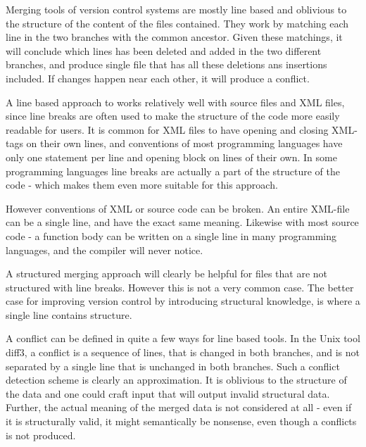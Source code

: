 \documentclass[11pt]{article}
\begin{document}
Merging tools of version control systems are mostly line based and oblivious to the structure of the content of the files contained. They work by matching each line in the two branches with the common ancestor. Given these matchings, it will conclude which lines has been deleted and added in the two different branches, and produce single file that has all these deletions ans insertions included. If changes happen near each other, it will produce a conflict.


A line based approach to works relatively well with source files and XML files, since line breaks are often used to make the structure of the code more easily readable for users. It is common for XML files to have opening and closing XML-tags on their own lines, and conventions of most programming languages have only one statement per line and opening block on lines of their own. In some programming languages line breaks are actually a part of the structure of the code - which makes them even more suitable for this approach.

However conventions of XML or source code can be broken. An entire XML-file can be a single line, and have the exact same meaning. Likewise with most source code - a function body can be written on a single line in many programming languages, and the compiler will never notice.


A structured merging approach will clearly be helpful for files that are not structured with line breaks. However this is not a very common case. The better case for improving version control by introducing structural knowledge, is where a single line contains structure. 

A conflict can be defined in quite a few ways for line based tools. In the Unix tool diff3, a conflict is a sequence of lines, that is changed in both branches, and is not separated by a single line that is unchanged in both branches. Such a conflict detection scheme is clearly an approximation. It is oblivious to the structure of the data and one could craft input that will output invalid structural data. Further, the  actual meaning of the merged data is not considered at all - even if it is structurally valid, it might semantically be nonsense, even though a conflicts is not produced.
\end{document}
